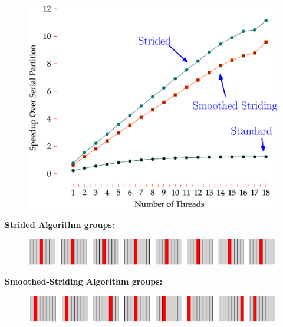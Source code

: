 \documentclass[xcolor=x11names, svgnames, rgb]{beamer}
\begin{document}




\begin{frame}[t]{}
  \begin{figure}
    \begin{center}
      \includegraphics[width=0.9\linewidth]{imgs/compiledGraph.eps}
    \end{center}
  \end{figure}
\end{frame}

\begin{frame}[t]{}
\textbf{Strided Algorithm groups:}
\begin{figure} \includegraphics[width=\linewidth]{imgs/stridedAlgHighlighted.png} \end{figure}

\vspace{2cm}

\textbf{Smoothed-Striding Algorithm groups:}
\begin{figure} \includegraphics[width=\linewidth]{imgs/smoothedStridingAlgHighlighted.png} \end{figure}
\end{frame}
\end{document}
